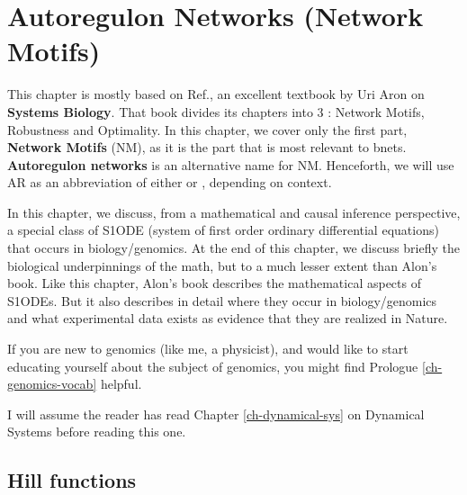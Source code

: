 \chapter{Autoregulon Networks (Network Motifs)}
\label{ch-autoregulons}


This chapter is mostly based on Ref.\cite{alon-book},
an excellent textbook by Uri Aron 
on {\bf Systems Biology}. That book divides its chapters into 3 : Network Motifs, Robustness and Optimality. In this chapter, we cover only the first part, {\bf Network Motifs} (NM), as it is the part that is most relevant to bnets. {\bf Autoregulon networks}
is an alternative name for NM. 
Henceforth, we will use AR as 
an abbreviation of either
or ,
depending on context.

In this chapter, we discuss,
from a mathematical and causal inference perspective, a  special 
class of 
S1ODE (system of first order ordinary differential equations) that occurs in biology/genomics.
At the end of this chapter,
we discuss briefly the biological
underpinnings of the math, but 
to a much lesser extent than Alon's book.
 Like this chapter, 
Alon's book describes the mathematical aspects of
 S1ODEs. But it 
also describes  in detail where they occur in biology/genomics and what experimental data exists as evidence that they are 
realized in Nature. 

If you are new to genomics (like me, a physicist), and would like to start educating yourself about the subject
of genomics, you might find Prologue \ref{ch-genomics-vocab} helpful.


I will assume
the reader has read 
 Chapter \ref{ch-dynamical-sys}
on Dynamical Systems before reading this one.



\section{Hill functions}

